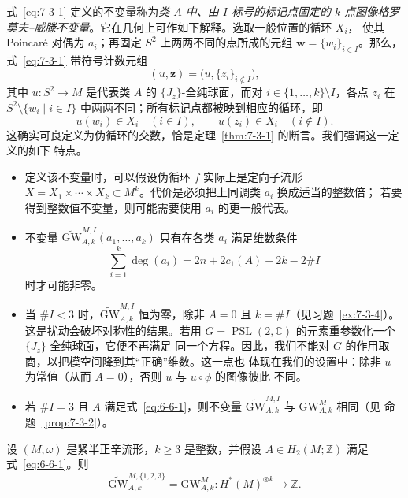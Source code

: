 式~\eqref{eq:7-3-1} 定义的不变量称为\emph{类 $A$ 中、由 $I$ 标号的标记点固定的
$k$-点图像格罗莫夫--威滕不变量}。它在几何上可作如下解释。选取一般位置的循环 $X_i$，
使其 Poincaré 对偶为 $a_i$；再固定 $S^2$ 上两两不同的点所成的元组
$\mathbf w=\{w_i\}_{i\in I}$。那么，式~\eqref{eq:7-3-1} 带符号计数元组
\[
  (u,\mathbf z)=\bigl(u,\{z_i\}_{i\notin I}\bigr),
\]
其中 $u:S^2\to M$ 是代表类 $A$ 的 $\{J_z\}$-全纯球面，而对
$i\in\{1,\ldots,k\}\setminus I$，各点 $z_i$ 在
$S^2\setminus\{w_i\mid i\in I\}$ 中两两不同；所有标记点都被映到相应的循环，即
\[
  u(w_i)\in X_i\quad(i\in I),
  \qquad
  u(z_i)\in X_i\quad(i\notin I).
\]
这确实可良定义为伪循环的交数，恰是定理~\ref{thm:7-3-1} 的断言。我们强调这一定义的如下
特点。
\begin{itemize}
\item 定义该不变量时，可以假设伪循环 $f$ 实际上是定向子流形
$X=X_1\times\cdots\times X_k\subset M^k$。代价是必须把上同调类 $a_i$ 换成适当的整数倍；
若要得到整数值不变量，则可能需要使用 $a_i$ 的更一般代表。
\item 不变量 $\widetilde{\mathrm{GW}}^{M,I}_{A,k}(a_1,\ldots,a_k)$ 只有在各类 $a_i$
满足维数条件
\begin{equation}\label{eq:7-3-2}
  \sum_{i=1}^k\deg(a_i)=2n+2c_1(A)+2k-2\#I
\end{equation}
时才可能非零。
\item 当 $\#I<3$ 时，$\widetilde{\mathrm{GW}}^{M,I}_{A,k}$ 恒为零，除非
$A=0$ 且 $k=\#I$（见习题~\ref{ex:7-3-4}）。这是扰动会破坏对称性的结果。若用
$G=\operatorname{PSL}(2,\mathbb C)$ 的元素重参数化一个 $\{J_z\}$-全纯球面，它便不再满足
同一个方程。因此，我们不能对 $G$ 的作用取商，以把模空间降到其“正确”维数。这一点也
体现在我们的设置中：除非 $u$ 为常值（从而 $A=0$），否则 $u$ 与 $u\circ\phi$ 的图像彼此
不同。
\item 若 $\#I=3$ 且 $A$ 满足式~\eqref{eq:6-6-1}，则不变量
$\widetilde{\mathrm{GW}}^{M,I}_{A,k}$ 与 $\mathrm{GW}^M_{A,k}$ 相同（见
命题~\ref{prop:7-3-2}）。
\end{itemize}

\begin{proposition}\label{prop:7-3-2}
设 $(M,\omega)$ 是紧半正辛流形，$k\ge3$ 是整数，并假设
$A\in H_2(M;\mathbb Z)$ 满足式~\eqref{eq:6-6-1}。则
\[
  \widetilde{\mathrm{GW}}^{M,\{1,2,3\}}_{A,k}
  =\mathrm{GW}^M_{A,k}:H^*(M)^{\otimes k}\longrightarrow\mathbb Z.
\]
\end{proposition}

